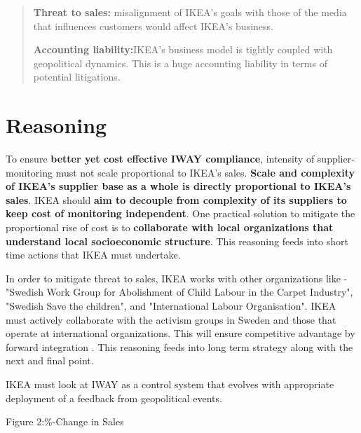 \documentclass[a4paper, oneside, 11pt]{memoir}
\begin{document}
\begin{abstract}
\begin{enumerate*}
 \item \textbf{Threat to sales:} misalignment of IKEA's goals with those of the media that influences customers would affect IKEA's business. 
 \item \textbf{Accounting liability:}IKEA's business model is tightly coupled with geopolitical dynamics. This is a huge accounting liability in terms of potential litigations.
\end{enumerate*}
\end{abstract}

\section{Reasoning}
\begin{enumerate*}
\item To ensure \textbf{better yet cost effective IWAY compliance}, intensity of supplier-monitoring must not scale proportional to IKEA's sales. \textbf{Scale and complexity of IKEA's supplier base as a whole is directly proportional to IKEA's sales}. IKEA should \textbf{aim to decouple from complexity of its suppliers to keep cost of monitoring independent}. One practical solution to mitigate the proportional rise of cost is to \textbf{collaborate with local organizations that understand local socioeconomic structure}. This reasoning feeds into short time actions that IKEA must undertake.
\item In order to mitigate threat to sales, IKEA works with other organizations like - "Swedish Work Group for Abolishment of Child Labour in the Carpet Industry", "Swedish Save the children", and "International Labour Organisation"\cite{publichearing1998_479}. IKEA must actively collaborate with the activism groups in Sweden and those that operate at international organizations. This will ensure competitive advantage by forward integration \cite{harrigan1985vertical}. This reasoning feeds into long term strategy along with the next and final point.
\item IKEA must look at IWAY as a control system that evolves with appropriate deployment of a feedback from geopolitical events.
\end{enumerate*}




Figure 2:\%-Change in Sales\\
\end{document}

